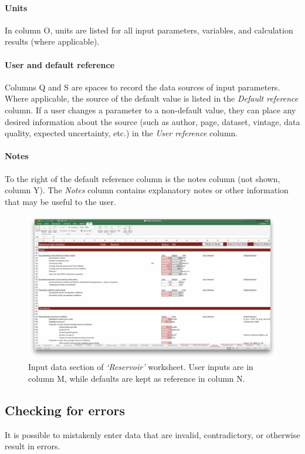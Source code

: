 \documentclass[11pt]{report}
\newcommand{\sheet}[1]{\textit{`{#1}'}}
\begin{document}
\paragraph{Units} In column O, units are listed for all input parameters, variables, and calculation results (where applicable).

\paragraph{User and default reference} Columns Q and S are spaces to record the data sources of input parameters. Where applicable, the source of the default value is listed in the \emph{Default reference} column. If a user changes a parameter to a non-default value, they can place any desired information about the source (such as author, page, dataset, vintage, data quality, expected uncertainty, etc.) in the \emph{User reference} column.

\paragraph{Notes} To the right of the default reference column is the notes column (not shown, column Y). The \emph{Notes} column contains explanatory notes or other information that may be useful to the user.

\begin{figure}[t]
\includegraphics[width=1.2\columnwidth]{images/InputSS.png}
\caption{Input data section of \sheet{Reservoir} worksheet. User inputs are in column M, while defaults are kept as reference in column N.}
\label{fig:Production_Inputs}
\end{figure}

\subsection{Checking for errors}
It is possible to mistakenly enter data that are invalid, contradictory, or otherwise result in errors. 
\end{document}
